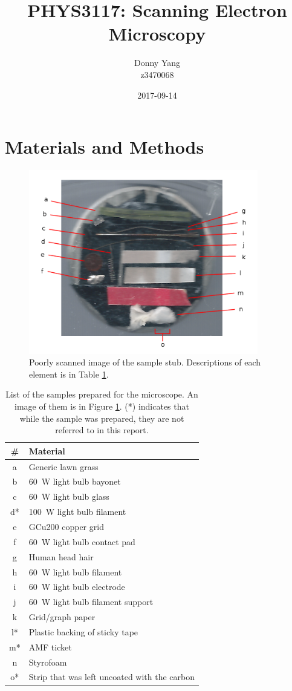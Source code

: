 \documentclass[a4paper]{scrartcl}
\begin{document}
\title{PHYS3117: Scanning Electron Microscopy}
\author{Donny Yang \\ z3470068}
\date{2017-09-14}
\maketitle

\section{Materials and Methods}
\begin{figure}
    \centering
    \includegraphics[width = 10cm]{samples.png}
    \caption{Poorly scanned image of the sample stub. Descriptions of each element is in Table \ref{tab:samples}.}
    \label{fig:samples}
\end{figure}
\begin{table}
    \centering
    \begin{tabular}{c | l}
    \# & Material \\
    \hline
    a & Generic lawn grass \\
    b & \SI{60}{\watt} light bulb bayonet \\
    c & \SI{60}{\watt} light bulb glass \\
    d* & \SI{100}{\watt} light bulb filament \\
    e & GCu200 copper grid \\
    f & \SI{60}{\watt} light bulb contact pad \\
    g & Human head hair \\
    h & \SI{60}{\watt} light bulb filament \\
    i & \SI{60}{\watt} light bulb electrode \\
    j & \SI{60}{\watt} light bulb filament support \\
    k & Grid/graph paper \\
    l* & Plastic backing of sticky tape \\
    m* & AMF ticket \\
    n & Styrofoam \\
    o* & Strip that was left uncoated with the carbon
    \end{tabular}
    \caption{List of the samples prepared for the microscope. An image of them is in Figure \ref{fig:samples}. (*) indicates that while the sample was prepared, they are not referred to in this report.}
    \label{tab:samples}
\end{table}
\end{document}
